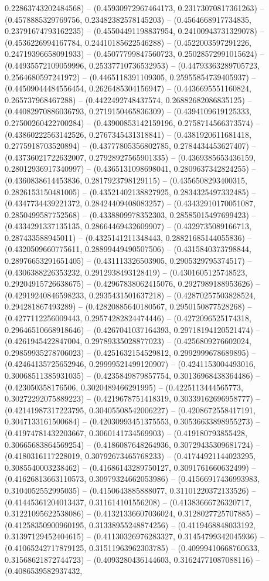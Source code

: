 0.22863743202484568) -- (0.45930972967464173, 0.23173070817361263) -- (0.4578885329769756, 0.23482382578145203) -- (0.4564668917734835, 0.23791674793162235) -- (0.45504491198837954, 0.24100943731329078) -- (0.4536226994167784, 0.24410185622546288) -- (0.4522003597291226, 0.24719396658091933) -- (0.45077799847560723, 0.25028572991015624) -- (0.44935572109059996, 0.25337710736532953) -- (0.44793363289705723, 0.2564680597241972) -- (0.4465118391109305, 0.25955854739405937) -- (0.44509044484556454, 0.2626485304156947) -- (0.4436695551160824, 0.265737968467288) -- (0.4422492748437574, 0.26882682086835125) -- (0.44082970886036793, 0.2719150465836309) -- (0.4394109619125333, 0.27500260422700284) -- (0.43900853142159196, 0.2758714566373574) -- (0.43860222563142526, 0.2767345431318841) -- (0.4381920611681418, 0.2775918703520894) -- (0.43777805356802785, 0.2784434453627407) -- (0.43736021722632007, 0.27928927565901335) -- (0.4369385653436159, 0.28012936917340997) -- (0.4365131098698041, 0.2809637342824255) -- (0.4360838614453836, 0.2817923798129115) -- (0.4356508293400315, 0.2826153150481005) -- (0.43521402138827925, 0.2834325497332485) -- (0.4347734439221372, 0.28424409408083257) -- (0.43432910170051087, 0.2850499587752568) -- (0.4338809978352303, 0.28585015497699423) -- (0.4334291337135135, 0.28664469432609907) -- (0.4329735089166713, 0.287433588945011) -- (0.4325141211348443, 0.28821685144055836) -- (0.4320509660775611, 0.28899449490507506) -- (0.4315840373798844, 0.28976653291651405) -- (0.431113326503905, 0.2905329795374517) -- (0.4306388226353232, 0.2912938493128419) -- (0.4301605125748523, 0.29204915726638675) -- (0.42967838062415076, 0.2927989188953626) -- (0.42919240846598233, 0.2935431501637218) -- (0.42870257503828524, 0.294281867493289) -- (0.42820885640180567, 0.2950150877528268) -- (0.4277112256009443, 0.29574282824474446) -- (0.4272096525174318, 0.29646510668918646) -- (0.4267041037164393, 0.29718194120521474) -- (0.4261945422847004, 0.29789335028877023) -- (0.4256809276602024, 0.29859935278706023) -- (0.4251632154529812, 0.2992999678689895) -- (0.42464135725652946, 0.29999521499120907) -- (0.4241153004493016, 0.30068511385931035) -- (0.4235849879857754, 0.30136968438364486) -- (0.423050358176506, 0.3020489466291995) -- (0.4225113444565773, 0.30272292075889223) -- (0.4219678751418319, 0.30339162696958777) -- (0.42141987317223795, 0.30405508542006227) -- (0.4208672558417191, 0.3047133161500684) -- (0.42030993451375553, 0.30536633898955273) -- (0.41974781432203667, 0.3060141734569903) -- (0.419180793855428, 0.30665683864569254) -- (0.4186087648264936, 0.30729435309681724) -- (0.4180316117228019, 0.30792673465768233) -- (0.41744921144023295, 0.3085540003238462) -- (0.41686143289750127, 0.3091761660632499) -- (0.41626813663110573, 0.30979324662053986) -- (0.41566917436993983, 0.3104052552995035) -- (0.4150643885888077, 0.31101220372133526) -- (0.41445361204013437, 0.311614101556208) -- (0.41383666726320717, 0.31221095622538086) -- (0.41321336607036024, 0.3128027725707885) -- (0.41258350900960195, 0.31338955248874256) -- (0.4119468848033192, 0.31397129452404615) -- (0.41130326976283327, 0.31454799342045936) -- (0.41065242717879125, 0.31511963962303785) -- (0.40999410668760633, 0.31568621872744723) -- (0.4093280436144603, 0.31624771087088116) -- (0.4086539582937432, 